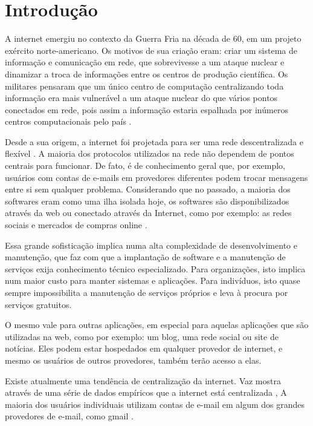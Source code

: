 \chapter{Introdução}
\label{cap-introducao}

A internet emergiu no contexto da Guerra Fria na década
de 60, em um projeto exército norte-americano. Os motivos de sua criação eram:
criar um sistema de informação e comunicação em rede, que
sobrevivesse a um ataque nuclear e dinamizar a troca de informações entre os centros de
produção científica. Os militares pensaram que um único centro de computação
centralizando toda informação era mais vulnerável a um ataque nuclear do que vários
pontos conectados em rede, pois assim a informação estaria espalhada por inúmeros
centros computacionais pelo país \cite{giles2010psychology}.

Desde a sua origem, a internet foi projetada para ser uma rede
descentralizada e flexível \cite{galaxia}. A maioria dos protocolos
utilizados na rede não dependem de pontos centrais para funcionar.
De fato, é de conhecimento geral
que, por exemplo, usuários com contas de e-mails em provedores diferentes podem
trocar mensagens entre si sem qualquer problema. Considerando que no
passado, a maioria dos softwares eram como uma ilha isolada 
hoje, os softwares são disponibilizados através da web ou conectado através da Internet,
como por exemplo: as redes sociais e mercados de compras online \cite{byhand}.

Essa grande sofisticação implica numa alta complexidade de
desenvolvimento e manutenção, que faz com que a
implantação de software e a manutenção de serviços exija conhecimento técnico
especializado. Para organizações, isto implica num maior
custo para manter sistemas e aplicações. Para indivíduos, isto quase sempre
impossibilita a manutenção de serviços próprios e leva à procura por serviços
gratuitos.

O mesmo vale para outras aplicações, em especial para aquelas aplicações
que são utilizadas na web, como por exemplo: um blog, uma rede social ou site de
notícias. Eles podem estar hospedados em qualquer provedor de internet, e mesmo os
usuários de outros provedores, também terão acesso a elas.

Existe atualmente uma tendência de centralização da internet. Vaz mostra
através de uma série de dados empíricos que a internet está centralizada \cite{vaz},
A maioria dos usuários individuais utilizam contas de e-mail em algum
dos grandes provedores de e-mail, como gmail \cite{shak2015}. 

